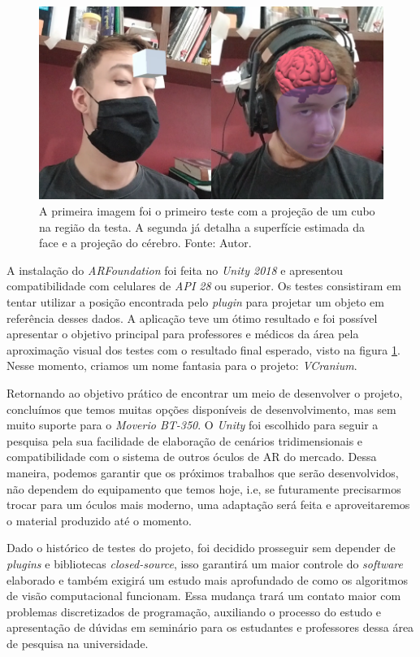 \begin{figure}[ht]
    \centering
    \includegraphics[width=.65\linewidth]{figuras/VCranium.png}
    \caption{A primeira imagem foi o primeiro teste com a projeção de um cubo na região da testa. A segunda já detalha a superfície estimada da face e a projeção do cérebro. Fonte: Autor.}
    \label{fig:arfoundation}
\end{figure}

A instalação do \textit{ARFoundation} foi feita no \textit{Unity 2018} e apresentou compatibilidade com celulares de \textit{API 28} ou superior. Os testes consistiram em tentar utilizar a posição encontrada pelo \textit{plugin} para projetar um objeto em referência desses dados. A aplicação teve um ótimo resultado e foi possível apresentar o objetivo principal para professores e médicos da área pela aproximação visual dos testes com o resultado final esperado, visto na figura \ref{fig:arfoundation}. Nesse momento, criamos um nome fantasia para o projeto: \textit{VCranium}.

Retornando ao objetivo prático de encontrar um meio de desenvolver o projeto, concluímos que temos muitas opções disponíveis de desenvolvimento, mas sem muito suporte para o \textit{Moverio BT-350}. O \textit{Unity} foi escolhido para seguir a pesquisa pela sua facilidade de elaboração de cenários tridimensionais e compatibilidade com o sistema de outros óculos de AR do mercado. Dessa maneira, podemos garantir que os próximos trabalhos que serão desenvolvidos, não dependem do equipamento que temos hoje, i.e, se futuramente precisarmos trocar para um óculos mais moderno, uma adaptação será feita e aproveitaremos o material produzido até o momento.

Dado o histórico de testes do projeto, foi decidido prosseguir sem depender de \textit{plugins} e bibliotecas \textit{closed-source}, isso garantirá um maior controle do \textit{software} elaborado e também exigirá um estudo mais aprofundado de como os algoritmos de visão computacional funcionam. Essa mudança trará um contato maior com problemas discretizados de programação, auxiliando o processo do estudo e apresentação de dúvidas em seminário para os estudantes e professores dessa área de pesquisa na universidade.

